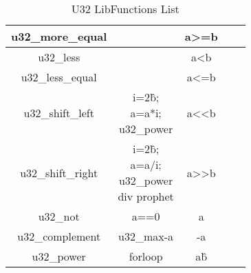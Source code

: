\begin{table}[!htp]
{\begin{tabular}{|c|c|c|c|c|}
                u32\_more\_equal &  & a>=b &  &  \\ \hline
                u32\_less  &  & a<b &  &  \\ \hline
                u32\_less\_equal  &  & a<=b &  &  \\ \hline
                u32\_shift\_left  & \makecell{i=2\^b; \\ a=a*i; \\ u32\_power} & a<<b &  &  \\ \hline
                u32\_shift\_right  & \makecell{i=2\^b; \\ a=a/i; \\ u32\_power \\ div prophet} & a>>b &  &  \\ \hline
                u32\_not  & a==0 & \!a &  &  \\ \hline
                u32\_complement  & u32\_max-a & -a &  &  \\ \hline
                u32\_power  & forloop & a\^b &  &  \\ \hline
            \end{tabular}}
        \caption{U32 LibFunctions List}
        \label{table:u32-libFunctions-list}
    \end{table}